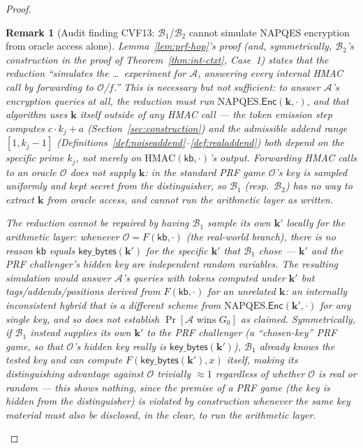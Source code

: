 \documentclass[11pt,a4paper]{article}
\newtheorem{remark}[theorem]{Remark}
\begin{document}
\begin{proof}
\begin{remark}[Audit finding CVF13: $\mathcal{B}_1$/$\mathcal{B}_2$ cannot simulate NAPQES encryption from oracle access alone]
\label{rem:cvf13}
Lemma~\ref{lem:prf-hop}'s proof (and, symmetrically, $\mathcal{B}_2$'s
construction in the proof of Theorem~\ref{thm:int-ctxt}, Case~1) states
that the reduction ``simulates the \dots\ experiment for $\mathcal{A}$,
answering every internal HMAC call by forwarding to $\mathcal{O}$/$f$.''
This is necessary but not sufficient: to answer $\mathcal{A}$'s
encryption queries at all, the reduction must run
$\mathrm{NAPQES}.\mathsf{Enc}(\mathbf{k},\cdot)$, and that algorithm uses
$\mathbf{k}$ itself \emph{outside} of any HMAC call --- the token emission
step computes $c\cdot k_j + a$ (Section~\ref{sec:construction}) and the
admissible addend range $[1,k_j-1]$
(Definitions~\ref{def:noiseaddend}--\ref{def:realaddend}) both depend on
the specific prime $k_j$, not merely on $\mathrm{HMAC}(\mathsf{kb},\cdot)$'s
output. Forwarding HMAC calls to an oracle $\mathcal{O}$ does not supply
$\mathbf{k}$: in the standard PRF game $\mathcal{O}$'s key is sampled
uniformly and kept secret from the distinguisher, so $\mathcal{B}_1$
(resp.\ $\mathcal{B}_2$) has no way to extract $\mathbf{k}$ from oracle
access, and cannot run the arithmetic layer as written.

The reduction cannot be repaired by having $\mathcal{B}_1$ sample its own
$\mathbf{k}'$ locally for the arithmetic layer: whenever
$\mathcal{O}=F(\mathsf{kb},\cdot)$ (the real-world branch), there is no
reason $\mathsf{kb}$ equals $\mathsf{key\_bytes}(\mathbf{k}')$ for the
\emph{specific} $\mathbf{k}'$ that $\mathcal{B}_1$ chose --- $\mathbf{k}'$
and the PRF challenger's hidden key are independent random variables. The
resulting simulation would answer $\mathcal{A}$'s queries with tokens
computed under $\mathbf{k}'$ but tags/addends/positions derived from
$F(\mathsf{kb},\cdot)$ for an unrelated $\mathbf{k}$: an internally
inconsistent hybrid that is a different scheme from
$\mathrm{NAPQES}.\mathsf{Enc}(\mathbf{k}',\cdot)$ for any single key, and
so does not establish $\Pr[\mathcal{A}\text{ wins }G_0]$ as claimed.
Symmetrically, if $\mathcal{B}_1$ instead supplies its own $\mathbf{k}'$
\emph{to} the PRF challenger (a ``chosen-key'' PRF game, so that
$\mathcal{O}$'s hidden key really is $\mathsf{key\_bytes}(\mathbf{k}')$),
$\mathcal{B}_1$ already knows the tested key and can compute
$F(\mathsf{key\_bytes}(\mathbf{k}'),x)$ itself, making its distinguishing
advantage against $\mathcal{O}$ trivially $\approx 1$ regardless of
whether $\mathcal{O}$ is real or random --- this shows nothing, since the
premise of a PRF game (the key is hidden from the distinguisher) is
violated by construction whenever the same key material must also be
disclosed, in the clear, to run the arithmetic layer.


\end{remark}
\end{proof}
\end{document}

